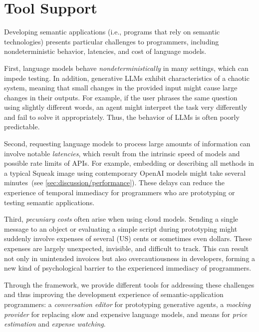 
\section{Tool Support}
\label{sec:semtex/tools}

Developing semantic applications (i.e., programs that rely on semantic technologies) presents particular challenges to programmers, including nondeterministic behavior, latencies, and cost of language models.

First, language models behave \emph{nondeterministically} in many settings, which can impede testing.
In addition, generative LLMs exhibit characteristics of a chaotic system, meaning that small changes in the provided input might cause large changes in their outputs.
For example, if the user phrases the same question using slightly different words, an agent might interpret the task very differently and fail to solve it appropriately.
Thus, the behavior of LLMs is often poorly predictable.

Second, requesting language models to process large amounts of information can involve notable \emph{latencies}, which result from the intrinsic speed of models and possible rate limits of APIs.
For example, embedding or describing all methods in a typical Squeak image using contemporary OpenAI models might take several minutes~(see \cref{sec:discussion/performance}).
These delays can reduce the experience of temporal immediacy for programmers who are prototyping or testing semantic applications.

Third, \emph{pecuniary costs} often arise when using cloud models.
Sending a single message to an object or evaluating a simple script during prototyping might suddenly involve expenses of several (US) cents or sometimes even dollars.
These expenses are largely unexpected, invisible, and difficult to track.
This can result not only in unintended invoices but also overcautiousness in developers, forming a new kind of psychological barrier to the experienced immediacy of programmers.

Through the \semtex framework, we provide different tools for addressing these challenges and thus improving the development experience of semantic-application programmers:
a \emph{conversation editor} for prototyping generative agents, a \emph{mocking provider} for replacing slow and expensive language models, and means for \emph{price estimation} and \emph{expense watching}.

